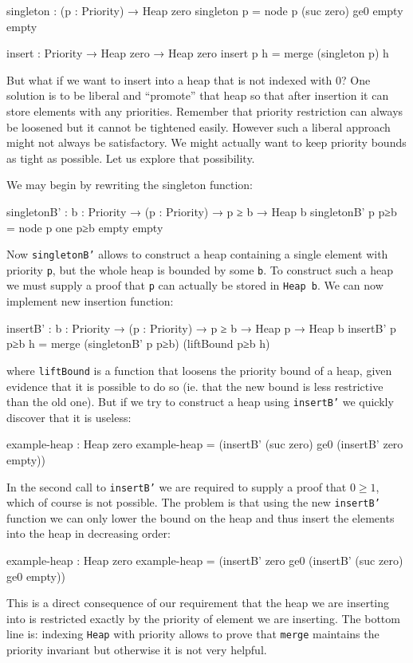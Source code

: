 \begin{code}
singleton : (p : Priority) → Heap zero
singleton p = node p (suc zero) ge0 empty empty

insert : Priority → Heap zero → Heap zero
insert p h = merge (singleton p) h
\end{code}

But what if we want to insert into a heap that is not indexed with 0? One solution is to be liberal and ``promote'' that heap so that after insertion it can store elements with any priorities. Remember that priority restriction can always be loosened but it cannot be tightened easily. However such a liberal approach might not always be satisfactory. We might actually want to keep priority bounds as tight as possible. Let us explore that possibility.

We may begin by rewriting the singleton function:

\begin{code}
singletonB' : {b : Priority} → (p : Priority) → p ≥ b → Heap b
singletonB' p p≥b = node p one p≥b empty empty
\end{code}
\noindent
Now \texttt{singletonB'} allows to construct a heap containing a single element with priority \texttt{p}, but the whole heap is bounded by some \texttt{b}. To construct such a heap we must supply a proof that \texttt{p} can actually be stored in \texttt{Heap b}. We can now implement new insertion function:

\begin{code}
insertB' : {b : Priority} → (p : Priority) → p ≥ b → Heap p → Heap b
insertB' p p≥b h = merge (singletonB' p p≥b) (liftBound p≥b h)
\end{code}
\noindent
where \texttt{liftBound} is a function that loosens the priority bound of a heap, given evidence that it is possible to do so (ie. that the new bound is less restrictive than the old one). But if we try to construct a heap using \texttt{insertB'} we quickly discover that it is useless:

\begin{code}
example-heap : Heap zero
example-heap = (insertB' (suc zero) ge0
               (insertB' zero  empty))
\end{code}
\noindent
In the second call to \texttt{insertB'} we are required to supply a proof that $0 \ge 1$, which of course is not possible. The problem is that using the new \texttt{insertB'} function we can only lower the bound on the heap and thus insert the elements into the heap in decreasing order:

\begin{code}
example-heap : Heap zero
example-heap = (insertB' zero ge0
               (insertB' (suc zero) ge0 empty))
\end{code}
\noindent
This is a direct consequence of our requirement that the heap we are inserting into is restricted exactly by the priority of element we are inserting. The bottom line is: indexing \texttt{Heap} with priority allows to prove that \texttt{merge} maintains the priority invariant but otherwise it is not very helpful.